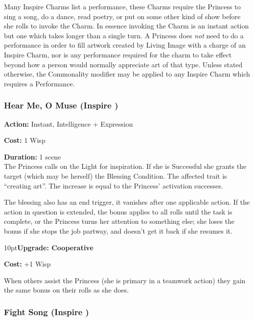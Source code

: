 Many Inspire Charms list a performance, these Charms require the Princess to sing a song, do a dance, read poetry, or put on some other kind of show before she rolls to invoke the Charm. In essence invoking the Charm is an instant action but one which takes longer than a single turn. A Princess does \textit{not} need to do a performance in order to fill artwork created by Living Image with a charge of an Inspire Charm, nor is any performance required for the charm to take effect beyond how a person would normally appreciate art of that type. Unless stated otherwise, the Commonality modifier may be applied to any Inspire Charm which requires a Performance.

\subsubsection*{Hear Me, O Muse (Inspire \textbullet)}

\noindent \textbf{Action:} Instant, Intelligence + Expression

\noindent \textbf{Cost:} 1 Wisp

\noindent \textbf{Duration:} 1 scene \\

\noindent The Princess calls on the Light for inspiration. If she is Successful she grants the target (which may be herself) the Blessing Condition. The affected trait is \textquotedblleft creating art\textquotedblright. The increase is equal to the Princess' activation successes. 

The blessing also has an end trigger, it vanishes after one applicable action. If the action in question is extended, the bonus applies to all rolls until the task is complete, or the Princess turns her attention to something else; she loses the bonus if she stops the job partway, and doesn't get it back if she resumes it.

\begin{myindentpar}{10pt}\textbf{Upgrade: Cooperative}

\noindent \textbf{Cost:} +1 Wisp

When others assist the Princess (she is primary in a teamwork action) they gain the same bonus on their rolls as she does.\end{myindentpar}

\subsubsection*{Fight Song (Inspire \textbullet)}

